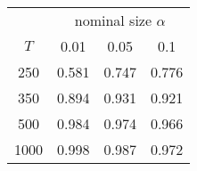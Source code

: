 % 
\begin{tabular}{cccc}
  \hline
  & \multicolumn{3}{c}{nominal size $\alpha$} \\
 $T$ & 0.01 & 0.05 & 0.1 \\
 \hline
250 & 0.581 & 0.747 & 0.776 \\ 
350 & 0.894 & 0.931 & 0.921 \\ 
  500 & 0.984 & 0.974 & 0.966 \\ 
  1000 & 0.998 & 0.987 & 0.972 \\ 
   \hline
\end{tabular}
